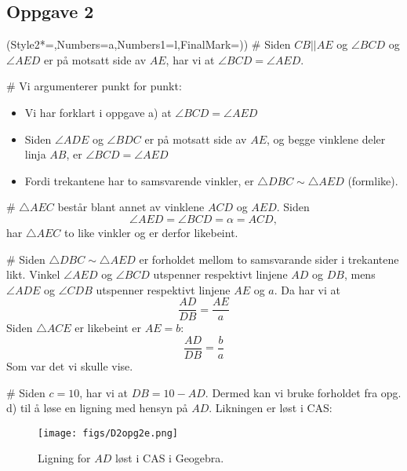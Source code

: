 \subsection*{Oppgave 2}
\begin{easylist}[enumerate]
	\ListProperties(Style2*=,Numbers=a,Numbers1=l,FinalMark={)})
	#  Siden $ CB|| AE $ og $ \angle BCD $ og $ \angle AED $ er på motsatt side av $ AE $, har vi at $ \angle BCD = \angle AED $. 
	
	
	# Vi argumenterer punkt for punkt:
	\begin{itemize}
		\item Vi har forklart i oppgave a) at $  \angle BCD = \angle AED$
		\item Siden $ \angle ADE $ og $ \angle BDC $ er på motsatt side av $ AE $, og begge vinklene deler linja $ AB $, er $ \angle BCD = \angle AED $ 
		\item Fordi trekantene har to samsvarende vinkler, er $ \triangle DBC \sim \triangle AED $ (formlike).
	\end{itemize}
	
	
	# $ \triangle AEC $ består blant annet av vinklene $ ACD $ og $ AED. $ Siden 
	\begin{equation*}
		\angle AED = \angle BCD = \alpha = ACD,
	\end{equation*}
	 har $ \triangle AEC $ to like vinkler og er derfor likebeint.
	 
	 
	# Siden $ \triangle DBC \sim \triangle AED $ er forholdet mellom to samsvarande sider i trekantene likt. 
	Vinkel $ \angle AED$ og $ \angle BCD $ utspenner respektivt linjene $ AD $ og $ DB $, mens $ \angle ADE$ og $ \angle CDB $ utspenner respektivt linjene $ AE $ og $ a$. 
	Da har vi at
	\begin{equation*}
		\frac{AD}{DB}= \frac{AE}{a}
	\end{equation*}
	Siden $ \triangle ACE $ er likebeint er $ AE=b $:
	\begin{equation*}
		\frac{AD}{DB}= \frac{b}{a}
	\end{equation*}
	Som var det vi skulle vise.


	# Siden $ c=10 $, har vi at $ DB=10-AD $. 
	Dermed kan vi bruke forholdet fra opg. d) til å løse en ligning med hensyn på $ AD $. 
	Likningen er løst i CAS:
	\begin{figure}[h]
		\centering
		\texttt{[image: figs/D2opg2e.png]}
		\caption{Ligning for $ AD $ løst i CAS i Geogebra.}
	\end{figure}
\end{easylist}



